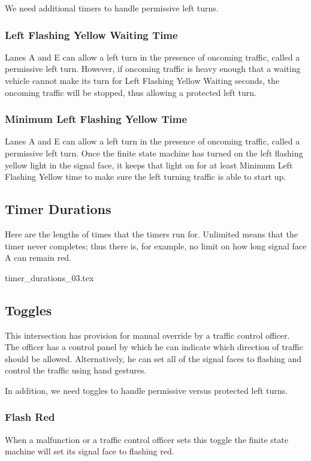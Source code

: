 \documentclass[letterpaper,twoside]{article}
\begin{document}
We need additional timers to handle permissive left turns.

\subsubsection{Left Flashing Yellow Waiting Time}

Lanes A and E can allow a left turn in the presence of oncoming traffic,
called a permissive left turn. However, if oncoming traffic is heavy enough
that a waiting vehicle cannot make its turn for Left Flashing Yellow Waiting
seconds, the oncoming traffic will be stopped, thus allowing a protected left
turn.

\subsubsection{Minimum Left Flashing Yellow Time}

Lanes A and E can allow a left turn in the presence of oncoming traffic,
called a permissive left turn. Once the finite state machine has turned on
the left flashing yellow light in the signal face, it keeps that light on
for at least Minimum Left Flashing Yellow time to make sure the left turning
traffic is able to start up.

\subsection{Timer Durations}

Here are the lengths of times that the timers run for.  Unlimited means
that the timer never completes; thus there is, for example, no limit on
how long signal face A can remain red.

 {timer_durations_03.tex}

\subsection{Toggles}

This intersection has provision for manual override by a traffic control
officer.  The officer has a control panel by which he can indicate which
direction of traffic should be allowed.  Alternatively, he can set all
of the signal faces to flashing and control the traffic using hand gestures.

In addition, we need toggles to handle permissive versus protected
left turns.

\subsubsection{Flash Red}
When a malfunction or a traffic control officer sets this toggle
the finite state machine will set its signal face to flashing red.
\end{document}
